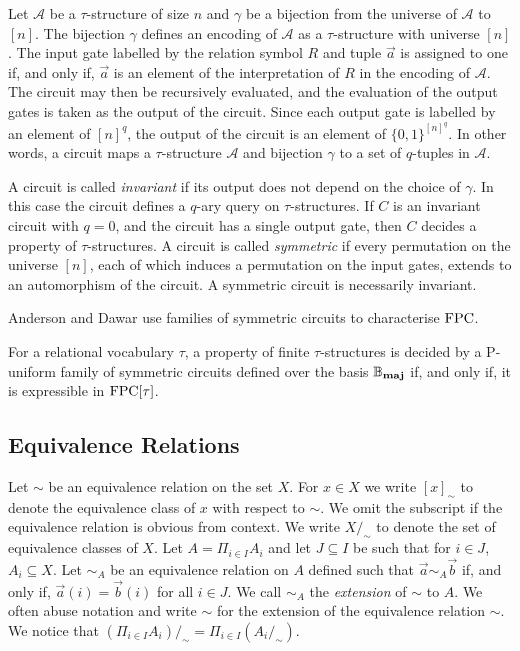 \documentclass[../paper.tex]{subfiles}
\begin{document}
Let $\mathcal{A}$ be a $\tau$-structure of size $n$ and $\gamma$ be a bijection
from the universe of $\mathcal{A}$ to $[n]$. The bijection $\gamma$ defines an
encoding of $\mathcal{A}$ as a $\tau$-structure with universe $[n]$. The input
gate labelled by the relation symbol $R$ and tuple $\vec{a}$ is assigned to one
if, and only if, $\vec{a}$ is an element of the interpretation of $R$ in the
encoding of $\mathcal{A}$. The circuit may then be recursively evaluated, and
the evaluation of the output gates is taken as the output of the circuit. Since
each output gate is labelled by an element of $[n]^q$, the output of the circuit
is an element of $\{0,1\}^{[n]^q}$. In other words, a circuit maps a
$\tau$-structure $\mathcal{A}$ and bijection $\gamma$ to a set of $q$-tuples in
$\mathcal{A}$.

A circuit is called \emph{invariant} if its output does not depend on the choice
of $\gamma$. In this case the circuit defines a $q$-ary query on
$\tau$-structures. If $C$ is an invariant circuit with $q = 0$, and the circuit
has a single output gate, then $C$ decides a property of $\tau$-structures. A circuit
is called \emph{symmetric} if every permutation on the universe $[n]$, each of
which induces a permutation on the input gates, extends to an automorphism of
the circuit. A symmetric circuit is necessarily invariant.

Anderson and Dawar use families of symmetric circuits to characterise $\text{\upshape FPC}$.

\begin{thm}
  For a relational vocabulary $\tau$, a property of finite $\tau$-structures is
  decided by a P-uniform family of symmetric circuits defined over the basis
  $\mathbb{B}_{\text{\textbf{maj}}}$ if, and only if, it is expressible in $\text{\upshape FPC}[\tau]$.
\end{thm}

\subsection{Equivalence Relations}
Let $\sim$ be an equivalence relation on the set $X$. For $x \in X$ we write
$[x]_\sim$ to denote the equivalence class of $x$ with respect to $\sim$. We
omit the subscript if the equivalence relation is obvious from context. We write
$X/_{\sim}$ to denote the set of equivalence classes of $X$. Let $A = \Pi_{i \in
  I} A_i$ and let $J \subseteq I$ be such that for $i \in J$, $A_i \subseteq X$.
Let $\sim_A$ be an equivalence relation on $A$ defined such that $\vec{a} \sim_A
\vec{b}$ if, and only if, $\vec{a}(i) = \vec{b}(i)$ for all $i \in J$. We call
$\sim_A$ the \emph{extension} of $\sim$ to $A$. We often abuse notation and
write $\sim$ for the extension of the equivalence relation $\sim$. We notice
that $(\Pi_{i \in I} A_i) /_{\sim} = \Pi_{i \in I} (A_i /_\sim)$.
\end{document}
